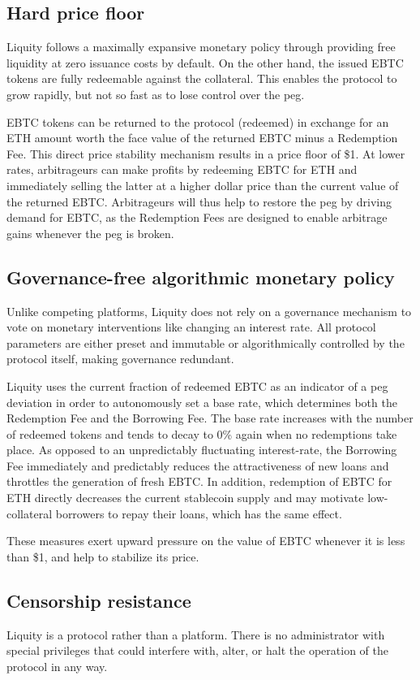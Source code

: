 \documentclass{article}
\begin{document}
\subsection{Hard price floor}
Liquity follows a maximally expansive monetary policy through providing free liquidity at zero issuance costs by default. On the other hand, the issued EBTC tokens are fully redeemable against the collateral. This enables the protocol to grow rapidly, but not so fast as to lose control over the peg.

EBTC tokens can be returned to the protocol (redeemed) in exchange for an ETH amount worth the face value of the returned EBTC minus a Redemption Fee. This direct price stability mechanism results in a price floor of \$1. At lower rates, arbitrageurs can make profits by redeeming EBTC for ETH and immediately selling the latter at a higher dollar price than the current value of the returned EBTC. Arbitrageurs will thus help to restore the peg by driving demand for EBTC, as the Redemption Fees are designed to enable arbitrage gains whenever the peg is broken.

\subsection{Governance-free algorithmic monetary policy}
Unlike competing platforms, Liquity does not rely on a governance mechanism to vote on monetary interventions like changing an interest rate. All protocol parameters are either preset and immutable or algorithmically controlled by the protocol itself, making governance redundant.

Liquity uses the current fraction of redeemed EBTC as an indicator of a peg deviation in order to autonomously set a base rate, which determines both the Redemption Fee and the Borrowing Fee. The base rate increases with the number of redeemed tokens and tends to decay to 0\% again when no redemptions take place. As opposed to an unpredictably fluctuating interest-rate, the Borrowing Fee immediately and predictably reduces the attractiveness of new loans and throttles the generation of fresh EBTC. In addition, redemption of EBTC for ETH directly decreases the current stablecoin supply and may motivate low-collateral borrowers to repay their loans, which has the same effect. 

These measures exert upward pressure on the value of EBTC whenever it is less than \$1, and help to stabilize its price.

\subsection{Censorship resistance}
Liquity is a protocol rather than a platform. There is no administrator with special privileges that could interfere with, alter, or halt the operation of the protocol in any way.
\end{document}

